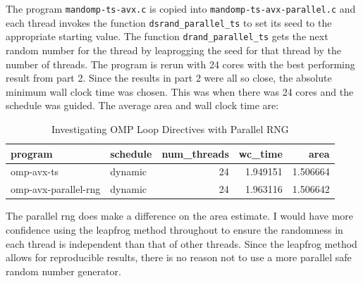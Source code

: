\documentclass{article}
\begin{document}
The program \texttt{mandomp-ts-avx.c} is copied into \texttt{mandomp-ts-avx-parallel.c} and each thread 
invokes the function \texttt{dsrand\_parallel\_ts} to set its seed to the appropriate starting value. The function 
\texttt{drand\_parallel\_ts} gets the next random number for the thread by leaprogging the seed for that thread 
by the number of threads. The program is rerun with 24 cores with the best performing result from part 2. 
Since the results in part 2 were all so close, the absolute minimum wall clock time was chosen. 
This was when there was 24 cores and the schedule was guided. The average area and wall clock time are:
\begin{table}[H]
    \centering
    \caption{Investigating OMP Loop Directives with Parallel RNG}
    \fontsize{12}{14}\selectfont
    \begin{tabular}[t]{l|l|r|r|r}
    \hline
    program & schedule & num\_threads & wc\_time & area\\
    \hline
    omp-avx-ts & dynamic & 24 & 1.949151 & 1.506664\\
    \hline
    omp-avx-parallel-rng & dynamic & 24 & 1.963116 & 1.506642\\
    \hline
    \end{tabular}
\end{table}
\noindent The parallel rng does make a difference on the area estimate. I would 
have more confidence using the leapfrog method throughout to ensure the randomness 
in each thread is independent than that of other threads. Since the leapfrog method allows 
for reproducible results, there is no reason not to use a more parallel safe random number generator.
\end{document}
